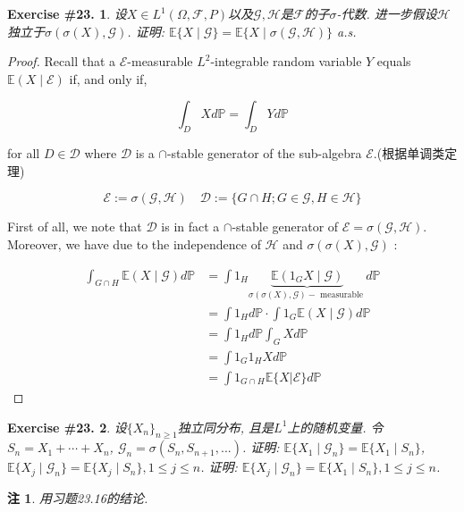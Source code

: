 \documentclass[UTF8, a4paper]{article}
\newtheorem{exercise}{Exercise \#23.}
\newtheorem*{remark}{注}
\begin{document}
\begin{framed}
\begin{exercise}
设\(X \in L^1(\Omega, \mathcal{F}, P)\)以及\(\mathcal{G}, \mathcal{H}\)是\(\mathcal{F}\)的子\(\sigma\)-代数.
进一步假设\(\mathcal{H}\)独立于\(\sigma(\sigma(X), \mathcal{G})\).
证明: \(\mathbb{E}\{X\mid \mathcal{G}\} = \mathbb{E}\{X\mid \sigma(\mathcal{G}, \mathcal{H})\}\) a.s.
\end{exercise}
\end{framed}

\begin{proof}
Recall that a $\mathcal{E}$-measurable $L^2$-integrable random variable $Y$ equals $\mathbb{E}(X \mid \mathcal{E})$ if, and only if,

$$
\int_D X d \mathbb{P}=\int_D Y d \mathbb{P}
$$

for all $D \in \mathcal{D}$ where $\mathcal{D}$ is a $\cap$-stable generator of the sub-algebra $\mathcal{E}$.(根据单调类定理)

$$
\mathcal{E}:=\sigma(\mathcal{G}, \mathcal{H}) \quad \mathcal{D}:=\{G \cap H ; G \in \mathcal{G}, H \in \mathcal{H}\}
$$


First of all, we note that $\mathcal{D}$ is in fact a $\cap$-stable generator of $\mathcal{E}=\sigma(\mathcal{G}, \mathcal{H})$. Moreover, we have due to the independence of $\mathcal{H}$ and $\sigma(\sigma(X), \mathcal{G})$ :

$$
\begin{aligned}
\int_{G \cap H} \mathbb{E}(X \mid \mathcal{G}) d \mathbb{P} & =\int 1_H \underbrace{\mathbb{E}\left(1_G X \mid \mathcal{G}\right)}_{\sigma(\sigma(X), \mathcal{G})-\text { measurable }} d \mathbb{P} \\
& =\int 1_H d \mathbb{P} \cdot \int 1_G \mathbb{E}(X \mid \mathcal{G}) d \mathbb{P} \\
& =\int 1_H d \mathbb{P} \int_G X d \mathbb{P} \\
& =\int 1_G 1_H X d \mathbb{P} \\
& =\int 1_{G \cap H} \mathbb{E}\{X|\mathcal{E}\} d \mathbb{P}
\end{aligned}
$$


\end{proof}


\begin{framed}
\begin{exercise}
设\(\{X_n\}_{n\geq 1}\)独立同分布, 且是\(L^1\)上的随机变量.
令\(S_n = X_1 + \cdots + X_n\), \(\mathcal{G}_n = \sigma(S_n, S_{n+1}, ...)\).
证明: \(\mathbb{E}\{X_1 \mid \mathcal{G}_n\} = \mathbb{E}\{X_1 \mid S_n\}\), \(\mathbb{E}\{X_j \mid \mathcal{G}_n\} = \mathbb{E}\{X_j \mid S_n\}, 1 \leq j \leq n\).
证明: \(\mathbb{E}\{X_j \mid \mathcal{G}_n\} = \mathbb{E}\{X_1 \mid S_n\}, 1 \leq j \leq n\).
\end{exercise}
\end{framed}
\begin{remark}
用习题23.16的结论.
\end{remark}
\end{document}
